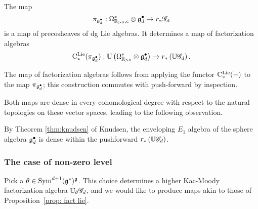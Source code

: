 \begin{prop}
\label{prop: fact lie}
The map
\[
\pi_{\mathfrak g^\bullet_d}: \Omega^*_{\mathbb R_{>0},c} \otimes \mathfrak g^\bullet_d \to r_*\mathscr G_d 
\] 
is a map of precosheaves of dg Lie algebras.
It determines a map of factorization algebras
\[
{\rm C}^{\rm Lie}_*(\pi_{\mathfrak g^\bullet_d}) : \mathbb U\left(\Omega^{*}_{\mathbb R_{>0}} \otimes \mathfrak g^\bullet_d\right) \to r_*\left(\mathbb U \mathscr G_d \right) .
\]
\end{prop}

The map of factorization algebras follows from applying the functor ${\rm C}^{\rm Lie}_*(-)$ to the map $\pi_{\mathfrak g^\bullet_d}$;
this construction commutes with push-forward by inspection. 

Both maps are dense in every cohomological degree with respect to the natural topologies on these vector spaces,
leading to the following observation.


\begin{cor}
By Theorem \ref{thm:knudsen} of Knudsen, 
the enveloping $E_1$ algebra of the sphere algebra $\mathfrak g^\bullet_d$ is dense within the pushforward $r_*\left(\mathbb U \mathscr G_d \right)$.
\end{cor}

\subsubsection{The case of non-zero level}

Pick a $\theta \in {\rm Sym}^{d+1}(\mathfrak g^*)^\mathfrak g$. 
This choice determines a higher Kac-Moody factorization algebra $\mathbb U_\theta \mathscr G_d$,
and we would like to produce maps akin to those of Proposition~\ref{prop: fact lie}.

